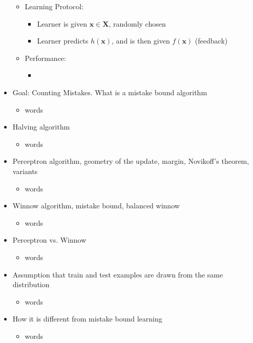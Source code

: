 \documentclass{article}
\begin{document}
\begin{itemize}
\begin{itemize}
\begin{itemize}
          \end{itemize}
        \item Learning Protocol:
          \begin{itemize}
            \item Learner is given $\mathbf{x}\in \mathbf{X}$, randomly chosen
            \item Learner predicts $h(\mathbf{x})$, and is then given $f(\mathbf{x})$ (feedback)
          \end{itemize}
        \item Performance:
          \begin{itemize}
            \item 
          \end{itemize}
	\end{itemize}
\item Goal: Counting Mistakes. What is a mistake bound algorithm
	\begin{itemize}
	\item words
	\end{itemize}
\item Halving algorithm
	\begin{itemize}
	\item words
	\end{itemize}
\item Perceptron algorithm, geometry of the update, margin, Novikoff's theorem, variants
	\begin{itemize}
	\item words
	\end{itemize}
\item Winnow algorithm, mistake bound, balanced winnow
	\begin{itemize}
	\item words
	\end{itemize}
\item Perceptron vs. Winnow
	\begin{itemize}
	\item words
	\end{itemize}
\end{itemize}

\hspace{-1.5em}{\large \bf Batch Learning}
\begin{itemize}
\item Assumption that train and test examples are drawn from the same distribution 
	\begin{itemize}
	\item words
	\end{itemize}
\item How it is different from mistake bound learning
	\begin{itemize}
	\item words
	\end{itemize}
\end{itemize}
\end{document}
